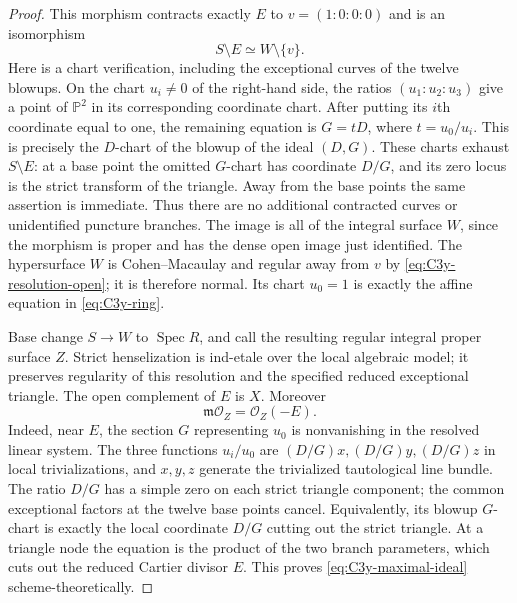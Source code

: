 \begin{proof}
This morphism contracts exactly $E$ to
$v=(1:0:0:0)$ and is an isomorphism
\begin{equation}\label{eq:C3y-resolution-open}
                           S\setminus E\simeq W\setminus\{v\}.
\end{equation}
Here is a chart verification, including the exceptional curves
of the twelve blowups. On the chart $u_i\ne0$ of the right-hand
side, the ratios $(u_1:u_2:u_3)$ give a point of $\mathbb P^2$
in its corresponding coordinate chart. After putting its
$i$th coordinate equal to one, the remaining equation is
$G=tD$, where $t=u_0/u_i$. This is precisely the $D$-chart
of the blowup of the ideal $(D,G)$. These charts exhaust
$S\setminus E$: at a base point the omitted $G$-chart
has coordinate $D/G$, and its zero locus is the strict
transform of the triangle. Away from the base points the
same assertion is immediate. Thus there are no additional
contracted curves or unidentified puncture branches.
The image is all of the integral surface $W$, since the
morphism is proper and has the dense open image just
identified. The hypersurface $W$ is Cohen--Macaulay and
regular away from $v$ by \eqref{eq:C3y-resolution-open};
it is therefore normal. Its chart $u_0=1$ is exactly
the affine equation in \eqref{eq:C3y-ring}.

Base change $S\to W$ to $\operatorname{Spec}R$, and call
the resulting regular integral proper surface $Z$.
Strict henselization is ind-etale over the local algebraic
model; it preserves regularity of this resolution and the
specified reduced exceptional triangle. The open complement
of $E$ is $X$. Moreover
\begin{equation}\label{eq:C3y-maximal-ideal}
                        \mathfrak m\mathcal O_Z=\mathcal O_Z(-E).
\end{equation}
Indeed, near $E$, the section $G$ representing $u_0$ is
nonvanishing in the resolved linear system. The three
functions $u_i/u_0$ are $(D/G)x,(D/G)y,(D/G)z$ in local
trivializations, and $x,y,z$ generate the trivialized
tautological line bundle. The ratio $D/G$ has a simple
zero on each strict triangle component; the common
exceptional factors at the twelve base points cancel.
Equivalently, its blowup $G$-chart is exactly the local
coordinate $D/G$ cutting out the strict triangle. At
a triangle node the equation is the product of the two
branch parameters, which cuts out the reduced Cartier
divisor $E$. This proves \eqref{eq:C3y-maximal-ideal}
scheme-theoretically.


\end{proof}
